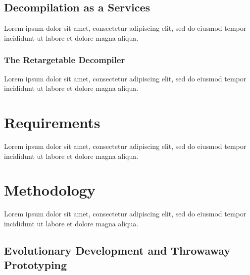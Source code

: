 \documentclass[12pt, a4paper]{article}
\begin{document}
\subsection{Decompilation as a Services}

Lorem ipsum dolor sit amet, consectetur adipiscing elit, sed do eiusmod tempor incididunt ut labore et dolore magna aliqua.


\subsubsection{The Retargetable Decompiler}

Lorem ipsum dolor sit amet, consectetur adipiscing elit, sed do eiusmod tempor incididunt ut labore et dolore magna aliqua.

\cite{retargetable_decomp}



\section{Requirements}

Lorem ipsum dolor sit amet, consectetur adipiscing elit, sed do eiusmod tempor incididunt ut labore et dolore magna aliqua.


\section{Methodology}

Lorem ipsum dolor sit amet, consectetur adipiscing elit, sed do eiusmod tempor incididunt ut labore et dolore magna aliqua.



\subsection{Evolutionary Development and Throwaway Prototyping}
\end{document}
